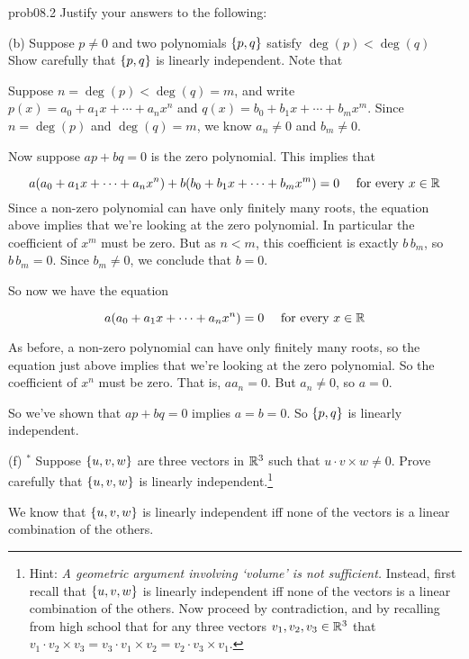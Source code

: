 \begin{sol}{prob08.2} Justify your answers to the following:\medskip
 


(b) Suppose $p\not=0$ and two  polynomials $\{p, q \}$ satisfy $\deg(p) <\deg(q)$ Show carefully that $\{p,q \}$  is linearly independent. Note that 

\soln Suppose $n=\deg(p) <\deg(q)=m$, and write $p(x)=a_0+a_1x +\cdots + a_n x^n$ and $q(x)=b_0+b_1x +\cdots + b_m x^m$. Since $n=\deg(p) $ and $\deg(q)=m$, we know $a_n\not=0$ and $b_m\not= 0$.

Now suppose $ ap +b q=0$ is the zero polynomial. This implies that

$$a(a_0+a_1x +\cdots + a_n x^n) + b(b_0+b_1x +\cdots + b_m x^m)=0 \quad \text{ for every } x\in \mathbb{R} $$ Since a non-zero polynomial can have only finitely many roots, the equation above implies that we're looking at the zero polynomial. In particular the coefficient of $x^m$ must be zero. But as $n<m$,  this coefficient is exactly $b \,b_m $, so $b \,b_m=0 $. Since $b_m\not= 0$, we conclude that $b=0$. 

So now we have the equation

$$a(a_0+a_1x +\cdots + a_n x^n) =0 \quad \text{ for every } x\in \mathbb{R} $$

As before,  a non-zero polynomial can have only finitely many roots, so the equation just above implies that we're looking at the zero polynomial. So the coefficient of $x^n$ must be zero. That is, $a a_n=0$. But $a_n\not=0$, so $a=0$. 

So we've shown that $ ap +b q=0$ implies $a=b=0$. So  $\{p,q \}$ is linearly independent.

\medskip
%



(f) $^\ast$  Suppose $\{u,v,w \}$ are three vectors in $\mathbb{R}^3$ such that $u\cdot v\times w \not=0$. Prove carefully that $\{u,v,w \}$ is linearly independent.\footnote{ Hint: {\it A geometric argument involving `volume' is not sufficient.} Instead, first recall that  $\{u,v,w \}$ is linearly independent iff none of the vectors is a linear combination of the others. Now proceed by contradiction, and by recalling  from high school that for any three vectors $v_1, v_2, v_3 \in \mathbb{R}^3$ that $v_1\cdot v_2\times v_3=v_3\cdot v_1\times v_2=v_2\cdot v_3\times v_1$.}

\soln We know that $\{u,v,w \}$ is linearly independent iff none of the vectors is a linear combination of the others. 


\end{sol}
